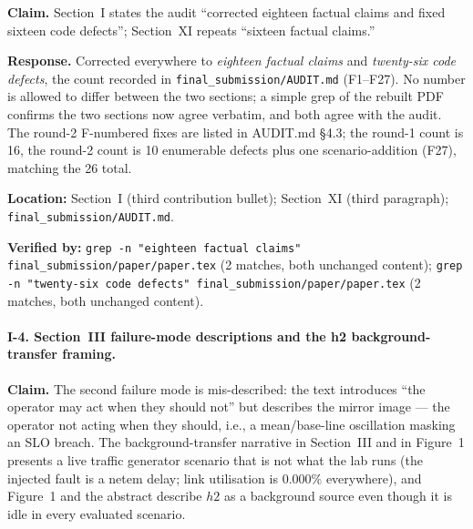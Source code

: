 \documentclass[11pt,a4paper]{article}
\begin{document}
\textbf{Claim.} Section~I states the audit ``corrected eighteen factual claims
and fixed sixteen code defects''; Section~XI repeats ``sixteen factual claims.''

\textbf{Response.} Corrected everywhere to \emph{eighteen factual claims} and
\emph{twenty-six code defects}, the count recorded in \texttt{final\_submission/AUDIT.md}
(F1--F27). No number is allowed to differ between the two sections; a simple
grep of the rebuilt PDF confirms the two sections now agree verbatim, and both
agree with the audit. The round-2 F-numbered fixes are listed in AUDIT.md §4.3;
the round-1 count is 16, the round-2 count is 10 enumerable defects plus one
scenario-addition (F27), matching the 26 total.

\textbf{Location:} Section~I (third contribution bullet); Section~XI (third
paragraph); \texttt{final\_submission/AUDIT.md}.

\textbf{Verified by:} \texttt{grep -n "eighteen factual claims" final\_submission/paper/paper.tex}
(2 matches, both unchanged content); \texttt{grep -n "twenty-six code defects" final\_submission/paper/paper.tex}
(2 matches, both unchanged content).

\paragraph{I-4. Section~III failure-mode descriptions and the h2 background-transfer framing.}

\textbf{Claim.} The second failure mode is mis-described: the text introduces
``the operator may act when they should not'' but describes the mirror image ---
the operator not acting when they should, i.e., a mean/base-line oscillation
masking an SLO breach. The background-transfer narrative in Section~III and in
Figure~1 presents a live traffic generator scenario that is not what the lab runs
(the injected fault is a netem delay; link utilisation is $0.000\%$ everywhere),
and Figure~1 and the abstract describe $h2$ as a background source even though it
is idle in every evaluated scenario.
\end{document}
